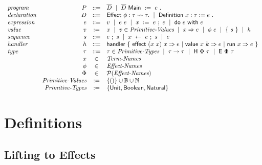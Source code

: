 \documentclass{article}
\begin{document}
\[ \begin{array}{lrcl}
  \textit{program} &
  P &::= &
    \overline{D} ~ \mid ~
    \overline{D}~\textsf{Main} ~ := ~ e ~.
  \\
  \textit{declaration} &
  D &::=&
    \textsf{Effect} ~ \phi : \tau \rightsquigarrow \tau. ~ \mid ~
    \textsf{Definition}~ x : \tau := e ~.
  \\
  \textit{expression} &
  e &::=&
    v ~ \mid ~
    e ~ e ~ \mid ~
    x ~:=~ e ~;~ e ~ \mid ~
    \textsf{do} ~ e ~ \textsf{with} ~ e
  \\
  \textit{value} &
  v &:=&
    x ~ \mid ~
    v \in \textit{Primitive-Values} ~ \mid ~
    x \Rightarrow e ~ \mid ~
    \phi ~ e ~ \mid ~
    \{~ s ~\} ~ \mid ~
    h
  \\
  \textit{sequence} &
  s &::=&
    e ~;~ s ~ \mid ~
    x ~\leftarrow~ e ~;~ s ~ \mid ~
    e
  \\
  \textit{handler} &
  h &::=&
    \textsf{handler} ~ \{~
      \textsf{effect} ~ (x ~ x) ~ x \Rightarrow e ~ | ~
      \textsf{value} ~ x ~ k \Rightarrow e ~ | ~
      \textsf{run} ~ x \Rightarrow e
    ~\}
  \\
  \textit{type} &
  \tau &::=&
    \tau \in \textit{Primitive-Types} ~ \mid ~
    \tau \rightarrow \tau ~ \mid ~
    \textsf{H} ~ \Phi ~ \tau ~ \mid ~
    \textsf{E} ~ \Phi ~ \tau
  \\
  & x &\in& \textit{Term-Names}
  \\
  & \phi &\in& \textit{Effect-Names}
  \\
  & \Phi &\in& \mathcal{P}(\textit{Effect-Names})
  \\
  & \textit{Primitive-Values} &:=&
    \{  ()  \} \cup \mathbb{B} \cup \mathbb{N}
  \\
  & \textit{Primitive-Types} &:=&
    \{  \textsf{Unit}, \textsf{Boolean}, \textsf{Natural}  \}
 \end{array} \]

\section{Definitions}

\subsection{Lifting to Effects}
\end{document}
